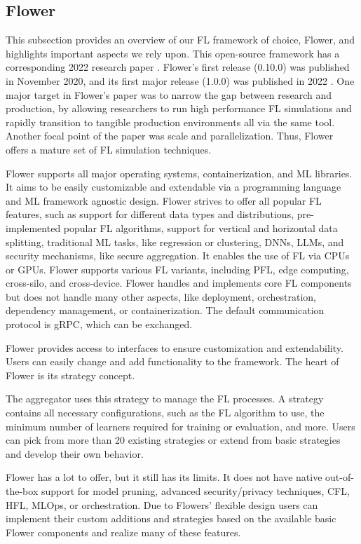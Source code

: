 \subsection{Flower}

This subsection provides an overview of our FL framework of choice, Flower,
and highlights important aspects we rely upon.
This open-source framework has a corresponding 2022 research paper \cite{paper:flower}.
Flower's first release (0.10.0) was published in November 2020,
and its first major release (1.0.0) was published in 2022 \cite{fl_framework:flower}.
One major target in Flower's paper was to narrow the gap between research and production,
by allowing researchers to run high performance FL simulations and rapidly transition
to tangible production environments all via the same tool.
Another focal point of the paper was scale and parallelization.
Thus, Flower offers a mature set of FL simulation techniques.

Flower supports all major operating systems, containerization, and ML libraries.
It aims to be easily customizable and extendable via a programming language and ML framework agnostic design.
Flower strives to offer all popular FL features, such as support for different data types and distributions,
pre-implemented popular FL algorithms, support for vertical and horizontal data splitting,
traditional ML tasks, like regression or clustering, DNNs, LLMs, and security mechanisms, like secure aggregation.
It enables the use of FL via CPUs or GPUs.
Flower supports various FL variants, including
PFL, edge computing, cross-silo, and cross-device.
Flower handles and implements core FL components but does not handle many other aspects, like deployment,
orchestration, dependency management, or containerization.
The default communication protocol is gRPC, which can be exchanged.

Flower provides access to interfaces to ensure customization and extendability.
Users can easily change and add functionality to the framework.
The heart of Flower is its strategy concept.

The aggregator uses this strategy to manage the FL processes.
A strategy contains all necessary configurations,
such as the FL algorithm to use, the minimum number of learners required for training or evaluation, and more.
Users can pick from more than 20 existing strategies or extend from basic strategies and develop their own behavior.

Flower has a lot to offer, but it still has its limits.
It does not have native out-of-the-box support for model pruning,
advanced security/privacy techniques, CFL, HFL, MLOps, or orchestration.
Due to Flowers' flexible design users can implement their custom additions and strategies
based on the available basic Flower components and realize many of these features.

